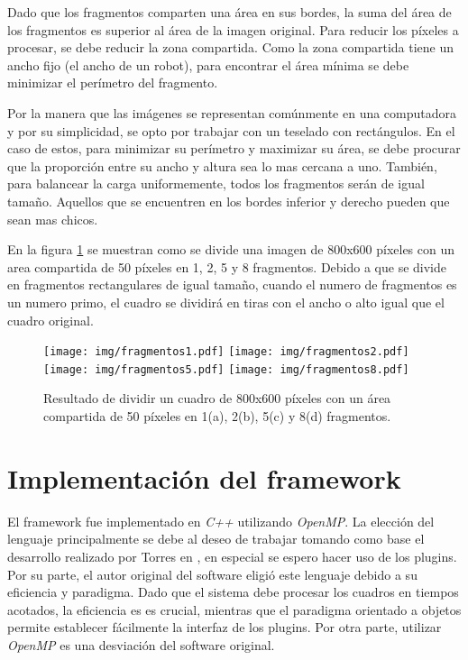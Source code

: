 Dado que los fragmentos comparten una área en sus bordes, la suma del área de
los fragmentos es superior al área de la imagen original. Para reducir los
píxeles a procesar, se debe reducir la zona compartida. Como la zona compartida
tiene un ancho fijo (el ancho de un robot), para encontrar el área mínima se
debe minimizar el perímetro del fragmento.

Por la manera que las imágenes se representan comúnmente en una computadora y
por su simplicidad, se opto por trabajar con un teselado con rectángulos. En el
caso de estos, para minimizar su perímetro y maximizar su área, se debe procurar
que la proporción entre su ancho y altura sea lo mas cercana a uno. También,
para balancear la carga uniformemente, todos los fragmentos serán de igual
tamaño. Aquellos que se encuentren en los bordes inferior y derecho pueden que
sean mas chicos.

En la figura \ref{fragmentos} se muestran como se divide una imagen de 800x600
píxeles con un area compartida de 50 píxeles en 1, 2, 5 y 8 fragmentos. Debido a
que se divide en fragmentos rectangulares de igual tamaño, cuando el numero de
fragmentos es un numero primo, el cuadro se dividirá en tiras con el ancho o
alto igual que el cuadro original.

\begin{figure}[!h]

	\texttt{[image: img/fragmentos1.pdf]}
	\texttt{[image: img/fragmentos2.pdf]}
	\texttt{[image: img/fragmentos5.pdf]}
	\texttt{[image: img/fragmentos8.pdf]}
	\caption{Resultado de dividir un cuadro de 800x600 píxeles con un área
	compartida de 50 píxeles en 1(a), 2(b), 5(c) y 8(d) fragmentos.}
	\label{fragmentos}

\end{figure}

\section{Implementación del framework}

El framework fue implementado en \emph{C++} utilizando \emph{OpenMP}. La
elección del lenguaje principalmente se debe al deseo de trabajar tomando como
base el desarrollo realizado por Torres en \cite{torres2014}, en especial se
espero hacer uso de los plugins. Por su parte, el autor original del software
eligió este lenguaje debido a su eficiencia y paradigma. Dado que el sistema
debe procesar los cuadros en tiempos acotados, la eficiencia es es crucial,
mientras que el paradigma orientado a objetos permite establecer fácilmente la
interfaz de los plugins. Por otra parte, utilizar \emph{OpenMP} es una
desviación del software original.

